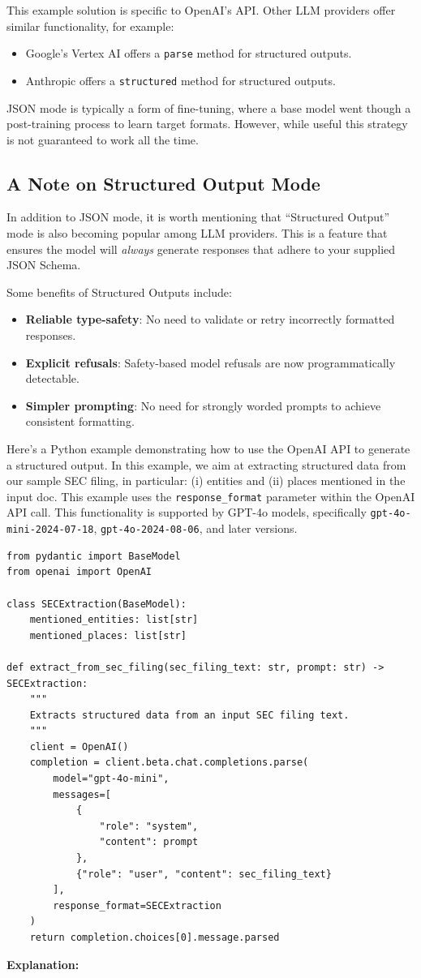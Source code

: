 This example solution is specific to OpenAI's API. Other LLM providers offer similar functionality, for example:

\begin{itemize}
    \item Google's Vertex AI offers a \texttt{parse} method for structured outputs.
    \item Anthropic offers a \texttt{structured} method for structured outputs.
\end{itemize}
JSON mode is typically a form of fine-tuning, where a base model went though a post-training process to learn target formats. However, while useful this strategy is not guaranteed to work all the time.

\subsection{A Note on Structured Output Mode}

In addition to JSON mode, it is worth mentioning that ``Structured Output'' mode is also becoming popular among LLM providers. This is a feature that ensures the model will \textit{always} generate responses that adhere to your supplied JSON Schema.

Some benefits of Structured Outputs include:
\begin{itemize}
    \item \textbf{Reliable type-safety}: No need to validate or retry incorrectly formatted responses.
    \item \textbf{Explicit refusals}: Safety-based model refusals are now programmatically detectable.
    \item \textbf{Simpler prompting}: No need for strongly worded prompts to achieve consistent formatting.
\end{itemize}

Here's a Python example demonstrating how to use the OpenAI API to generate a structured output. In this example, we aim at extracting structured data from our sample SEC filing, in particular: (i) entities and (ii) places mentioned in the input doc. This example uses the \texttt{response\_format} parameter within the OpenAI API call. This functionality is supported by GPT-4o models, specifically \texttt{gpt-4o-mini-2024-07-18}, \texttt{gpt-4o-2024-08-06}, and later versions.

\begin{verbatim}
from pydantic import BaseModel
from openai import OpenAI

class SECExtraction(BaseModel):
    mentioned_entities: list[str]
    mentioned_places: list[str]

def extract_from_sec_filing(sec_filing_text: str, prompt: str) -> SECExtraction:
    """
    Extracts structured data from an input SEC filing text.
    """
    client = OpenAI()
    completion = client.beta.chat.completions.parse(
        model="gpt-4o-mini",
        messages=[
            {
                "role": "system",
                "content": prompt
            },
            {"role": "user", "content": sec_filing_text}
        ],
        response_format=SECExtraction
    )
    return completion.choices[0].message.parsed
\end{verbatim}
\textbf{Explanation:}

